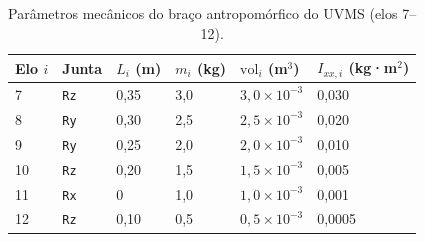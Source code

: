 \begin{table}[h!]
\centering
\caption{Parâmetros mecânicos do braço antropomórfico do UVMS (elos 7--12).}
\label{tab:uvms_mecanico}
\begin{tabular}{p{1.2cm} p{1.8cm} p{1.5cm} p{1.5cm} p{2.2cm} p{1.8cm}}
\hline
\textbf{Elo $i$} & \textbf{Junta} & $L_i$ (m) & $m_i$ (kg) & $\text{vol}_i$ (m$^3$) & $I_{xx,i}$ (kg·m$^2$) \\
\hline
7 & \texttt{Rz} & 0,35 & 3,0 & $3{,}0\times10^{-3}$ & 0,030 \\
8 & \texttt{Ry} & 0,30 & 2,5 & $2{,}5\times10^{-3}$ & 0,020 \\
9 & \texttt{Ry} & 0,25 & 2,0 & $2{,}0\times10^{-3}$ & 0,010 \\
10 & \texttt{Rz} & 0,20 & 1,5 & $1{,}5\times10^{-3}$ & 0,005 \\
11 & \texttt{Rx} & 0 & 1,0 & $1{,}0\times10^{-3}$ & 0,001 \\
12 & \texttt{Rz} & 0,10 & 0,5 & $0{,}5\times10^{-3}$ & 0,0005 \\
\hline
\end{tabular}
\end{table}

